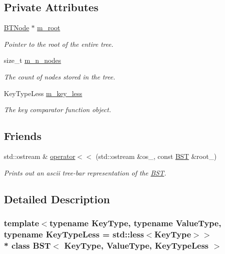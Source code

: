 \subsection*{Private Attributes}
\begin{DoxyCompactItemize}
\item 
\hyperlink{struct_b_s_t_1_1_b_t_node}{B\+T\+Node} $\ast$ \hyperlink{class_b_s_t_af2a361060692deacc5be429288eece96}{m\+\_\+root}
\begin{DoxyCompactList}\small\item\em Pointer to the root of the entire tree. \end{DoxyCompactList}\item 
size\+\_\+t \hyperlink{class_b_s_t_a38f358a38c855ebc8bd866f6ae96aa5a}{m\+\_\+n\+\_\+nodes}
\begin{DoxyCompactList}\small\item\em The count of nodes stored in the tree. \end{DoxyCompactList}\item 
Key\+Type\+Less \hyperlink{class_b_s_t_a7a6d8e3ed3109602f468ef20d03f733c}{m\+\_\+key\+\_\+less}
\begin{DoxyCompactList}\small\item\em The key comparator function object. \end{DoxyCompactList}\end{DoxyCompactItemize}
\subsection*{Friends}
\begin{DoxyCompactItemize}
\item 
std\+::ostream \& \hyperlink{class_b_s_t_aaf95a8d45e30cd664017a788b0c5193b}{operator$<$$<$} (std\+::ostream \&os\+\_\+, const \hyperlink{class_b_s_t}{B\+ST} \&root\+\_\+)
\begin{DoxyCompactList}\small\item\em Prints out an ascii tree-\/bar representation of the \hyperlink{class_b_s_t}{B\+ST}. \end{DoxyCompactList}\end{DoxyCompactItemize}


\subsection{Detailed Description}
\subsubsection*{template$<$typename Key\+Type, typename Value\+Type, typename Key\+Type\+Less = std\+::less$<$\+Key\+Type$>$$>$\\*
class B\+S\+T$<$ Key\+Type, Value\+Type, Key\+Type\+Less $>$}

